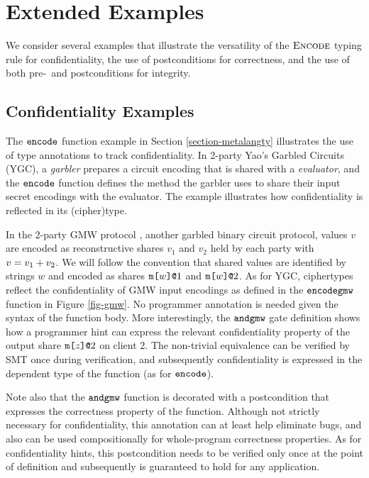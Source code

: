 \section{Extended Examples}

We consider several examples that illustrate the versatility of the $\text{\sc Encode}$
typing rule for confidentiality, the use of postconditions for correctness,
and the use of both pre-~and postconditions for integrity. 

\subsection{Confidentiality Examples}

The $\texttt{encode}$ function example in Section \ref{section-metalangty}
illustrates the use of type annotations to track confidentiality. In
2-party Yao's Garbled Circuits (YGC), a \emph{garbler} prepares a circuit encoding
that is shared with a \emph{evaluator}, and the $\texttt{encode}$ function
defines the method the garbler uses to share their input secret encodings
with the evaluator. The example illustrates how confidentiality is reflected
in its (cipher)type.



In the 2-party GMW protocol \cite{evans2018pragmatic}, another garbled
binary circuit protocol, values $v$ are encoded as reconstructive
shares $v_1$ and $v_2$ held by each party with $v = v_1 + v_2$.
We will follow the convention that shared values are identified by
strings $w$ and encoded as shares $\texttt{m[}w\texttt{]}\texttt{@}1$ and $\texttt{m[}w\texttt{]}\texttt{@}2$.  As for
YGC, ciphertypes reflect the confidentiality of GMW input encodings as
defined in the $\texttt{encodegmw}$ function in Figure \ref{fig-gmw}. No
programmer annotation is needed given the syntax of the function
body. More interestingly, the $\texttt{andgmw}$ gate definition shows how
a programmer hint can express the relevant confidentiality property of
the output share $\texttt{m[}z\texttt{]}\texttt{@}2$ on client 2. The non-trivial equivalence
can be verified by SMT once during verification, and subsequently
confidentiality is expressed in the dependent type of the function
(as for $\texttt{encode}$).

Note also that the $\texttt{andgmw}$ function is decorated with a
postcondition that expresses the correctness property of the
function. Although not strictly necessary for confidentiality, this
annotation can at least help eliminate bugs, and also can be used
compositionally for whole-program correctness properties. As for
confidentiality hints, this postcondition needs to be verified only
once at the point of definition and subsequently is guaranteed to hold
for any application.

